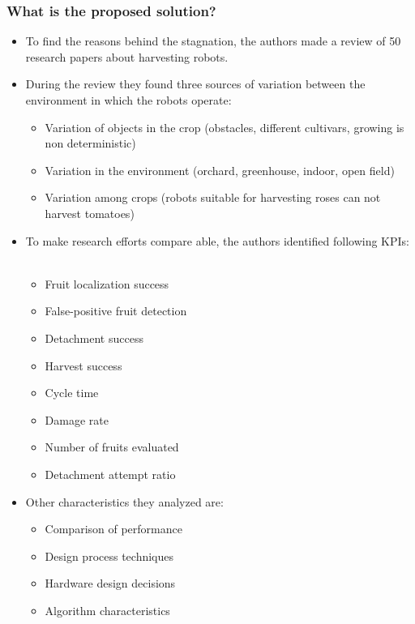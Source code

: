 \documentclass{article}
\begin{document}
\subsubsection*{What is the proposed solution?}
\begin{itemize}
    \item To find the reasons behind the stagnation, the authors made a review of 50 research papers about harvesting robots. 
    \item During the review they found three sources of variation between the environment in which the robots operate: \ \begin{itemize}
        \item Variation of objects in the crop (obstacles, different cultivars, growing is non deterministic)
        \item Variation in the environment (orchard, greenhouse, indoor, open field)
        \item Variation among crops (robots suitable for harvesting roses can not harvest tomatoes)
    \end{itemize}
    \item To make research efforts compare able, the authors identified following KPIs: \ \begin{itemize}
        \item Fruit localization success
        \item False-positive fruit detection
        \item Detachment success
        \item Harvest success
        \item Cycle time
        \item Damage rate
        \item Number of fruits evaluated
        \item Detachment attempt ratio
    \end{itemize}
    \item Other characteristics they analyzed are: \ \begin{itemize}
        \item Comparison of performance
        \item Design process techniques
        \item Hardware design decisions
        \item Algorithm characteristics 
    \end{itemize}
\end{itemize}
\end{document}
